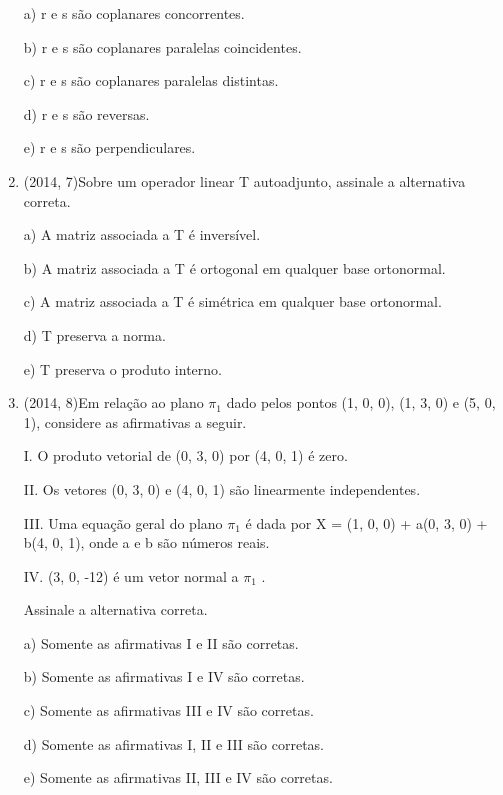 \documentclass{article}
\begin{document}
\begin{enumerate}
a) r e s são coplanares concorrentes.

b) r e s são coplanares paralelas coincidentes.

c) r e s são coplanares paralelas distintas.

d) r e s são reversas.

e) r e s são perpendiculares.\newline









\item(2014, 7)Sobre um operador linear T autoadjunto, assinale a alternativa correta.\newline

a) A matriz associada a T é inversível.

b) A matriz associada a T é ortogonal em qualquer base ortonormal.

c) A matriz associada a T é simétrica em qualquer base ortonormal.

d) T preserva a norma.

e) T preserva o produto interno.\newline






\item(2014, 8)Em relação ao plano $\pi_1$ dado pelos pontos (1, 0, 0), (1, 3, 0) e (5, 0, 1), considere as afirmativas a seguir.

I. O produto vetorial de (0, 3, 0) por (4, 0, 1) é zero.

II. Os vetores (0, 3, 0) e (4, 0, 1) são linearmente independentes.

III. Uma equação geral do plano $\pi_1$ é dada por X = (1, 0, 0) + a(0, 3, 0) + b(4, 0, 1), onde a e b são números reais.


IV. (3, 0, -12) é um vetor normal a $\pi_1$ .

Assinale a alternativa correta.\newline

a) Somente as afirmativas I e II são corretas.

b) Somente as afirmativas I e IV são corretas.

c) Somente as afirmativas III e IV são corretas.

d) Somente as afirmativas I, II e III são corretas.

e) Somente as afirmativas II, III e IV são corretas.\newline






\end{enumerate}
\end{document}
